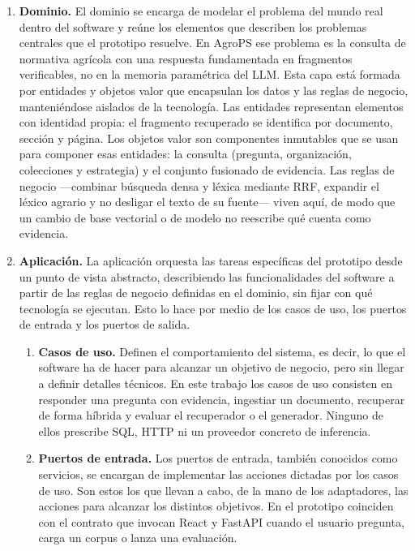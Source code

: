 \begin{enumerate}[leftmargin=*, itemsep=0.85em, label=\textbf{\arabic*.}]
  \item \textbf{Dominio.}
        El dominio se encarga de modelar el problema del mundo real dentro del software y reúne los elementos que describen los problemas centrales que el prototipo resuelve. En AgroPS ese problema es la consulta de normativa agrícola con una respuesta fundamentada en fragmentos verificables, no en la memoria paramétrica del LLM. Esta capa está formada por entidades y objetos valor que encapsulan los datos y las reglas de negocio, manteniéndose aislados de la tecnología. Las entidades representan elementos con identidad propia: el fragmento recuperado se identifica por documento, sección y página. Los objetos valor son componentes inmutables que se usan para componer esas entidades: la consulta (pregunta, organización, colecciones y estrategia) y el conjunto fusionado de evidencia. Las reglas de negocio ---combinar búsqueda densa y léxica mediante RRF, expandir el léxico agrario y no desligar el texto de su fuente--- viven aquí, de modo que un cambio de base vectorial o de modelo no reescribe qué cuenta como evidencia.

  \item \textbf{Aplicación.}
        La aplicación orquesta las tareas específicas del prototipo desde un punto de vista abstracto, describiendo las funcionalidades del software a partir de las reglas de negocio definidas en el dominio, sin fijar con qué tecnología se ejecutan. Esto lo hace por medio de los casos de uso, los puertos de entrada y los puertos de salida.

        \begin{enumerate}[leftmargin=*, itemsep=0.65em, label=\textbf{\arabic{enumi}.\arabic*.}]
          \item \textbf{Casos de uso.}
                Definen el comportamiento del sistema, es decir, lo que el software ha de hacer para alcanzar un objetivo de negocio, pero sin llegar a definir detalles técnicos. En este trabajo los casos de uso consisten en responder una pregunta con evidencia, ingestiar un documento, recuperar de forma híbrida y evaluar el recuperador o el generador. Ninguno de ellos prescribe SQL, HTTP ni un proveedor concreto de inferencia.

          \item \textbf{Puertos de entrada.}
                Los puertos de entrada, también conocidos como servicios, se encargan de implementar las acciones dictadas por los casos de uso. Son estos los que llevan a cabo, de la mano de los adaptadores, las acciones para alcanzar los distintos objetivos. En el prototipo coinciden con el contrato que invocan React y FastAPI cuando el usuario pregunta, carga un corpus o lanza una evaluación.


\end{enumerate}
\end{enumerate}
